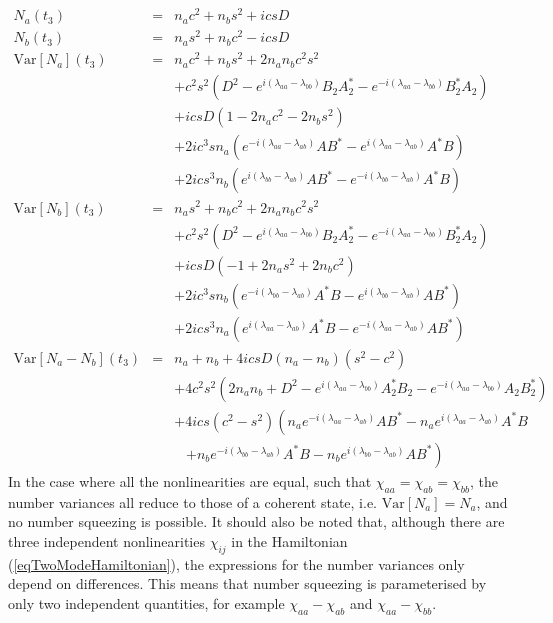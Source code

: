 \documentclass{iopart}
\begin{document}
\begin{eqnarray}
N_a(t_3) &=& n_a c^2 + n_b s^2 + i c s D \\
%
N_b(t_3) &=& n_a s^2 + n_b c^2 - i c s D \\
%
{\mathrm{Var}} [ N_a](t_3) &=& n_a c^2 + n_b s^2 + 2 n_a n_b c^2 s^2 \nonumber\\
       && + c^2 s^2 (D^2 - e^{i(\lambda_{aa} - \lambda_{bb})} B_2 A_2^* - e^{-i(\lambda_{aa} - \lambda_{bb})} B_2^* A_2) \nonumber \\
       && + i c s D (1-2 n_a c^2 -2 n_b s^2)  \nonumber\\
       && + 2 i c^3 s n_a (e^{-i(\lambda_{aa} - \lambda_{ab})} A B^* - e^{i(\lambda_{aa} - \lambda_{ab})} A^* B ) \nonumber \\
       && + 2 i c s^3 n_b (e^{i(\lambda_{bb} - \lambda_{ab})} A B^* - e^{-i(\lambda_{bb} - \lambda_{ab})} A^* B ) \\
%
{\mathrm{Var}} [ N_b](t_3) &=&  n_a s^2 + n_b c^2 + 2 n_a n_b c^2 s^2 \nonumber \\
       && + c^2 s^2 (D^2 - e^{i(\lambda_{aa} - \lambda_{bb})} B_2 A_2^* - e^{-i(\lambda_{aa} - \lambda_{bb})} B_2^* A_2 ) \nonumber \\
       && + i c s D (-1+2 n_a s^2 + 2 n_b c^2)  \nonumber \\
       && + 2 i c^3 s n_b (e^{-i(\lambda_{bb} - \lambda_{ab})} A^* B - e^{i(\lambda_{bb} - \lambda_{ab})} A B^* ) \nonumber \\
       && + 2 i c s^3 n_a (e^{i(\lambda_{aa} - \lambda_{ab})} A^* B - e^{-i(\lambda_{aa} - \lambda_{ab})} A B^* ) \\
%
{\mathrm{Var}} [ N_a - N_b](t_3) &=& n_a + n_b + 4 i c s D (n_a - n_b)(s^2 - c^2) \nonumber \\
       && + 4 c^2 s^2 (2 n_a n_b +D^2 - e^{i(\lambda_{aa} - \lambda_{bb})} A_2^* B_2 - e^{-i(\lambda_{aa} - \lambda_{bb})} A_2 B_2^* ) \nonumber \\
       && + 4 i c s (c^2 - s^2) \left( n_a e^{-i(\lambda_{aa} - \lambda_{ab})} A B^* - n_a e^{i(\lambda_{aa} - \lambda_{ab})} A^* B \right. \nonumber \\
       && \,\,\,\,\, \left. + n_b e^{-i(\lambda_{bb} - \lambda_{ab})} A^* B - n_b e^{i(\lambda_{bb} - \lambda_{ab})} A B^* \right) \label{eqNumDiffVariance}
\end{eqnarray}
In the case where all the nonlinearities are equal, such that $\chi_{aa} = \chi_{ab} = \chi_{bb}$, the number variances all reduce to those of a coherent state, i.e. ${\mathrm{Var}}[N_a]=N_a$, and no number squeezing is possible. It should also be noted that, although there are three independent nonlinearities $\chi_{ij}$ in the Hamiltonian (\ref{eqTwoModeHamiltonian}), the expressions for the number variances only depend on differences. This means that number squeezing is parameterised by only two independent quantities, for example $\chi_{aa}-\chi_{ab}$ and $\chi_{aa}-\chi_{bb}$.  
\end{document}
